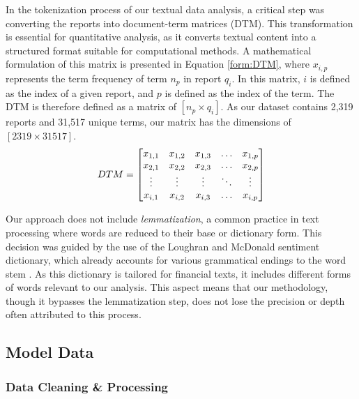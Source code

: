 In the tokenization process of our textual data analysis, a critical step was converting the reports into document-term matrices (DTM). This transformation is essential for quantitative analysis, as it converts textual content into a structured format suitable for computational methods. A mathematical formulation of this matrix is presented in Equation \ref{form:DTM}, where \(x_{i,p}\) represents the term frequency of term \(n_p\) in report \(q_i\). In this matrix, \(i\) is defined as the index of a given report, and \(p\) is defined as the index of the term. The DTM is therefore defined as a matrix of \([n_p \times q_i]\). As our dataset contains 2,319 reports and 31,517 unique terms, our matrix has the dimensions of \([2319 \times 31517]\).
\begin{equation}
    \label{form:DTM}
    \centering
    DTM\textit{}
    =
    \begin{bmatrix}
        x_{1,1} & x_{1,2} & x_{1,3} & \dots  & x_{1,p} \\
        x_{2,1} & x_{2,2} & x_{2,3} & \dots  & x_{2,p} \\
        \vdots & \vdots & \vdots & \ddots & \vdots \\
        x_{i,1} & x_{i,2} & x_{i,3} & \dots  & x_{i,p}
    \end{bmatrix}
\end{equation}

Our approach does not include \textit{lemmatization}, a common practice in text processing where words are reduced to their base or dictionary form. This decision was guided by the use of the Loughran and McDonald sentiment dictionary, which already accounts for various grammatical endings to the word stem \parencite{loughran2011liability}. As this dictionary is tailored for financial texts, it includes different forms of words relevant to our analysis. This aspect means that our methodology, though it bypasses the lemmatization step, does not lose the precision or depth often attributed to this process.










\subsection{Model Data}

\subsubsection{Data Cleaning \& Processing}

